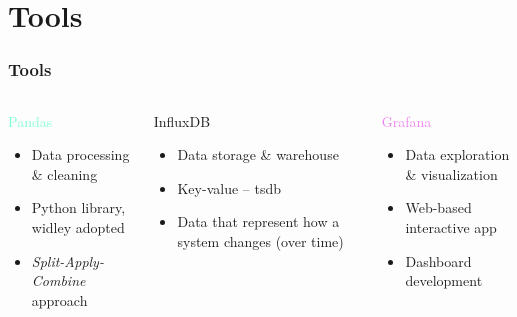\section{Tools}
\begin{frame}
    \frametitle{Tools}
    \vspace*{\fill}
    \begin{columns}[onlytextwidth, t]
        \begin{column}{.33\textwidth}
            \centering
            \textcolor{Aquamarine}{\Large Pandas}
            \vspace{0.5cm}

            \begin{itemize}
                \item Data processing \& cleaning
                \item Python library, widley adopted
                \item \textit{Split-Apply-Combine} approach
            \end{itemize}
        \end{column}

        \begin{column}{.33\textwidth}
            \centering
            \textcolor{YellowOrange}{\Large InfluxDB}
            \vspace{0.5cm}
            
            \begin{itemize}
                \item Data storage \& warehouse
                \item Key-value -- \acl{tsdb}
                \item Data that represent how a system changes (over time)
            \end{itemize}
        \end{column}


        \begin{column}{.33\textwidth}
            \centering
            \textcolor{violet}{\Large Grafana}
            \vspace{0.5cm}

            \begin{itemize}
                \item Data exploration \& visualization
                \item Web-based interactive app
                \item Dashboard development 
            \end{itemize}
        \end{column}
    \end{columns}
    \vspace*{\fill}
\end{frame}